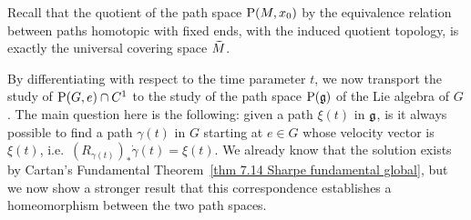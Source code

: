 Recall that the quotient of the path space $\mathrm{P}(M,x_0)$ by the equivalence relation between paths homotopic with fixed ends, with the induced quotient topology, is exactly the universal covering space $\wt{M}$.


By differentiating with respect to the time parameter $t$, we now transport the study of $\mathrm{P}(G,e)\cap C^1$ to the study of the path space $\mathrm{P}(\mathfrak{g})$ of the Lie algebra of $G$. The main question here is the following: given a path $\xi(t)$ in $\mathfrak{g}$, is it always possible to find a path $\gamma(t)$ in $G$ starting at $e\in G$ whose velocity vector is $\xi(t)$, i.e.~$\left(R_{\gamma(t)}\right)_{\ast}\dot\gamma(t)=\xi(t)$. We already know that the solution exists by Cartan's Fundamental Theorem~\ref{thm 7.14 Sharpe fundamental global}, but we now show a stronger result that this correspondence establishes a homeomorphism between the two path spaces.

